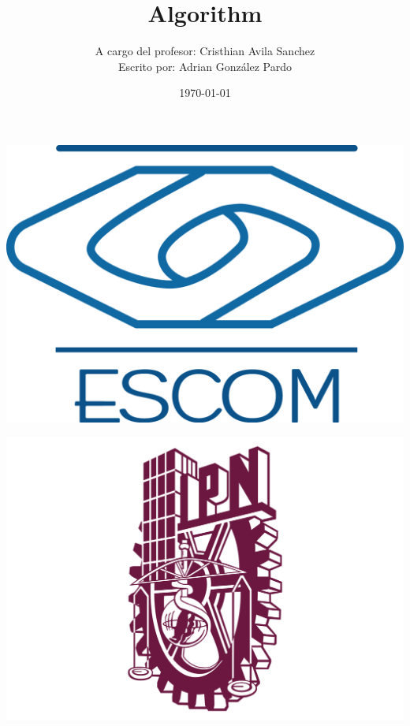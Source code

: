 \documentclass[10pt,executivepaper]{article}
\title{Algorithm}
\author{A cargo del profesor: Cristhian Avila Sanchez\\Escrito por: Adrian González Pardo}
\date{\today}
\begin{document}
\begin{minipage}{0.4\textwidth}
	\begin{flushleft}
		\includegraphics[scale = 0.05]{logoescom.png}
	\end{flushleft}
\end{minipage}
\begin{minipage}{0.51\textwidth}
	\begin{flushright}
		\includegraphics[scale = 0.055]{logoipn.png}
	\end{flushright}
\end{minipage}
\end{document}
